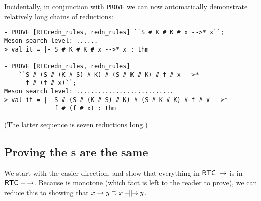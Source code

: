 Incidentally, in conjunction with \texttt{PROVE} we can now
automatically demonstrate relatively long chains of reductions:
\begin{session}
\begin{verbatim}
- PROVE [RTCredn_rules, redn_rules] ``S # K # K # x -->* x``;
Meson search level: ......
> val it = |- S # K # K # x -->* x : thm

- PROVE [RTCredn_rules, redn_rules]
    ``S # (S # (K # S) # K) # (S # K # K) # f # x -->*
      f # (f # x)``;
Meson search level: ...........................
> val it = |- S # (S # (K # S) # K) # (S # K # K) # f # x -->*
              f # (f # x) : thm
\end{verbatim}
\end{session}
(The latter sequence is seven reductions long.)


\subsection{Proving the s are the same}
\label{sec:Proving-RTCs-same}

We start with the easier direction, and show that everything in
${\sf RTC}\;\rightarrow$ is in ${\sf RTC}\;\mathbin{-\!\!\!\mid\mid\!\rightarrow}$.  Because
 is monotone (which fact is left to the reader to prove),
we can reduce this to showing that $x\rightarrow y\supset
x\mathbin{-\!\!\!\mid\mid\!\rightarrow} y$.

